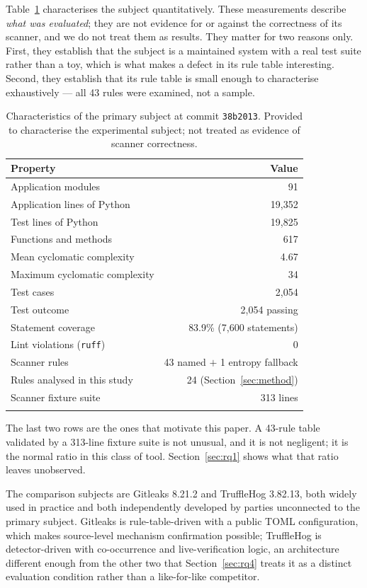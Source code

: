 \documentclass[pdflatex,sn-basic]{sn-jnl}
\begin{document}
Table~\ref{tab:subject} characterises the subject quantitatively. These measurements describe \emph{what was evaluated}; they are not evidence for or against the correctness of its scanner, and we do not treat them as results. They matter for two reasons only. First, they establish that the subject is a maintained system with a real test suite rather than a toy, which is what makes a defect in its rule table interesting. Second, they establish that its rule table is small enough to characterise exhaustively --- all 43 rules were examined, not a sample.

\begin{table}[t]
\centering
\caption{Characteristics of the primary subject at commit \texttt{38b2013}. Provided to characterise the experimental subject; not treated as evidence of scanner correctness.}
\label{tab:subject}
\small
\begin{tabular}{@{}lr@{}}
\toprule
Property & Value \\
\midrule
Application modules & 91 \\
Application lines of Python & 19{,}352 \\
Test lines of Python & 19{,}825 \\
Functions and methods & 617 \\
Mean cyclomatic complexity & 4.67 \\
Maximum cyclomatic complexity & 34 \\
\midrule
Test cases & 2{,}054 \\
Test outcome & 2{,}054 passing \\
Statement coverage & 83.9\% (7{,}600 statements) \\
Lint violations (\texttt{ruff}) & 0 \\
\midrule
Scanner rules & 43 named $+$ 1 entropy fallback \\
Rules analysed in this study & 24 (Section~\ref{sec:method}) \\
Scanner fixture suite & 313 lines \\
\botrule
\end{tabular}
\end{table}

The last two rows are the ones that motivate this paper. A 43-rule table validated by a 313-line fixture suite is not unusual, and it is not negligent; it is the normal ratio in this class of tool. Section~\ref{sec:rq1} shows what that ratio leaves unobserved.

The comparison subjects are Gitleaks 8.21.2 and TruffleHog 3.82.13, both widely used in practice and both independently developed by parties unconnected to the primary subject. Gitleaks is rule-table-driven with a public TOML configuration, which makes source-level mechanism confirmation possible; TruffleHog is detector-driven with co-occurrence and live-verification logic, an architecture different enough from the other two that Section~\ref{sec:rq4} treats it as a distinct evaluation condition rather than a like-for-like competitor.
\end{document}
